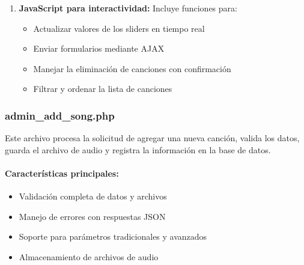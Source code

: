 \documentclass[a4paper,12pt]{article}
\begin{document}
\begin{enumerate}
    \item \textbf{JavaScript para interactividad:} Incluye funciones para:
    \begin{itemize}
        \item Actualizar valores de los sliders en tiempo real
        \item Enviar formularios mediante AJAX
        \item Manejar la eliminación de canciones con confirmación
        \item Filtrar y ordenar la lista de canciones
    \end{itemize}
\end{enumerate}

\subsubsection{admin\_add\_song.php}
Este archivo procesa la solicitud de agregar una nueva canción, valida los datos, guarda el archivo de audio y registra la información en la base de datos.

\paragraph{Características principales:}
\begin{itemize}
    \item Validación completa de datos y archivos
    \item Manejo de errores con respuestas JSON
    \item Soporte para parámetros tradicionales y avanzados
    \item Almacenamiento de archivos de audio
\end{itemize}
\end{document}
